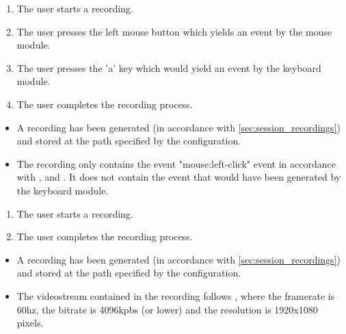 \begin{tests}
    {\begin{enumerate}
        \item The \gls{user} starts a recording.
        \item The \gls{user} presses the left mouse button which yields an \gls{event} by the mouse module.
        \item The \gls{user} presses the 'a' key which would yield an \gls{event} by the keyboard module.
        \item The \gls{user} completes the recording process.
    \end{enumerate}}
    {\begin{itemize}
        \item A recording has been generated (in accordance with \ref{sec:session_recordings}) and stored at the path specified by the configuration.
        \item The recording only contains the \gls{event} "mouse:left-click" \gls{event} in accordance with ,  and . It does not contain the \gls{event} that would have been generated by the keyboard module.
    \end{itemize}}
\newpage
    {\begin{enumerate}
        \item The \gls{user} starts a recording.
        \item The \gls{user} completes the recording process.
    \end{enumerate}}
    {\begin{itemize}
        \item A recording has been generated (in accordance with \ref{sec:session_recordings}) and stored at the path specified by the configuration.
        \item The \gls{videostream} contained in the recording follows , where the framerate is 60hz, the bitrate is 4096kpbs (or lower) and the resolution is 1920x1080 pixels.
    \end{itemize}}


\end{tests}
